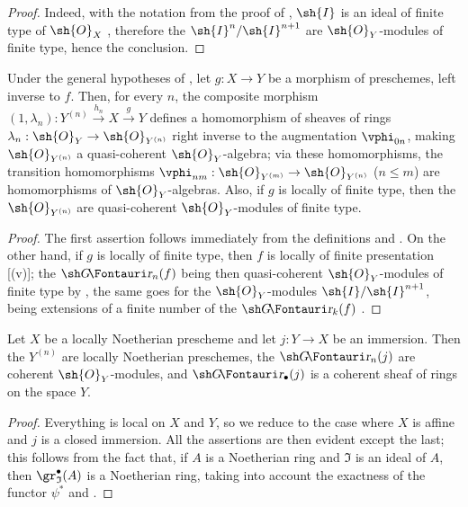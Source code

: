 \begin{proof}
Indeed, with the notation from the proof of , $\sh{I}$ is an ideal of finite type of $\sh{O}_X$ , therefore the $\sh{I}^n/\sh{I}^{n+1}$ are $\sh{O}_Y$-modules of finite type, hence the conclusion.
\end{proof}

\begin{corollary}[16.1.7]
\label{IV.16.1.7}
Under the general hypotheses of , let $g:X \to Y$ be a morphism of preschemes, left inverse to $f$.
Then, for every $n$, the composite morphism $(1, \lambda_n): Y^{(n)}\xrightarrow{h_n} X \xrightarrow{g} Y$ defines a homomorphism of sheaves of rings $\lambda_n: \sh{O}_Y \to \sh{O}_{Y^{(n)}}$ right inverse to the augmentation $\vphi_{0n}$, making $\sh{O}_{Y^{(n)}}$ a quasi-coherent $\sh{O}_Y$-algebra;
via these homomorphisms, the transition homomorphisms $\vphi_{nm}:\sh{O}_{Y^{(m)}} \to \sh{O}_{Y^{(n)}}$ ($n\leq m$) are homomorphisms of $\sh{O}_Y$-algebras.
Also, if $g$ is locally of finite type, then the $\sh{O}_{Y^{(n)}}$ are quasi-coherent $\sh{O}_Y$-modules of finite type.
\end{corollary}

\begin{proof}
The first assertion follows immediately from the definitions and .
On the other hand, if $g$ is locally of finite type, then $f$ is locally of finite presentation [(v)];
the $\shGr_n(f)$ being then quasi-coherent $\sh{O}_Y$-modules of finite type by , the same goes for the $\sh{O}_Y$-modules $\sh{I}/\sh{I}^{n+1}$, being extensions of a finite number of the $\shGr_k(f)$ .
\end{proof}

\begin{proposition}[16.1.8]
\label{IV.16.1.8}
Let $X$ be a locally Noetherian prescheme and let $j:Y \to X$ be an immersion.
Then the $Y^{(n)}$ are locally Noetherian preschemes, the $\shGr_n(j)$ are coherent $\sh{O}_Y$-modules, and $\shGr_\bullet(j)$ is a coherent sheaf of rings on the space $Y$.
\end{proposition}

\begin{proof}
Everything is local on $X$ and $Y$, so we reduce to the case where $X$ is affine and $j$ is a closed immersion. All the assertions are then evident except the last; this follows from the fact that, if $A$ is a Noetherian ring and $\mathfrak{I}$ is an ideal of $A$, then $\gr_\mathfrak{I}^\bullet(A)$ is a Noetherian ring, taking into account the exactness of the functor $\psi^*$ and .
\end{proof}

